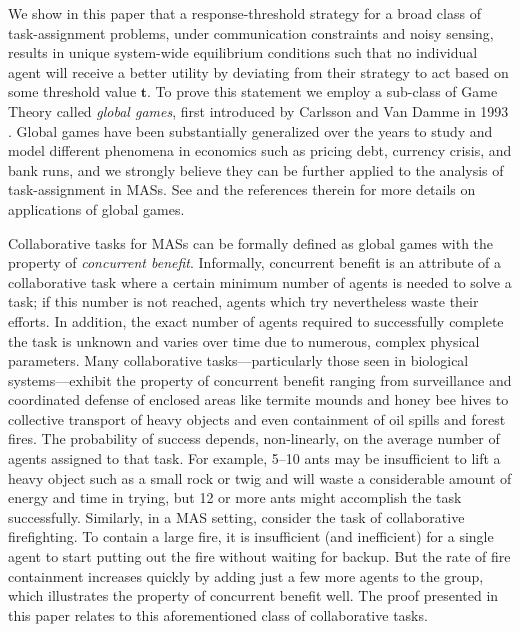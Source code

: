 \documentclass[conference]{ieeeconf}
\newcommand{\td}{\mathbf{t}}
\begin{document}
We show in this paper that a response-threshold strategy for a broad class of task-assignment problems, under communication constraints  and noisy sensing, results in unique system-wide equilibrium conditions such that no individual agent will receive a better utility by deviating from their strategy to act based on some threshold value $\td$. To prove this statement we employ a sub-class of Game Theory called \emph{global games}, first introduced by Carlsson and Van Damme in 1993 \cite{Carlsson1993}. Global games have been substantially generalized over the years to study and model different phenomena in economics such as pricing debt, currency crisis, and bank runs, and we strongly believe they can be further applied to the analysis of task-assignment in MASs. See \cite{Morris2000} and the references therein for more details on applications of global games.

Collaborative tasks for MASs can be formally defined as global games with the property of \emph{concurrent benefit}. Informally, concurrent benefit is an attribute of a collaborative task where a certain minimum number of agents is needed to solve a task; if this number is not reached, agents which try nevertheless waste their efforts. In addition, the exact number of agents required to successfully complete the task is unknown and varies over time due to numerous, complex physical parameters. Many collaborative tasks---particularly those seen in biological systems---exhibit the property of concurrent benefit ranging from surveillance and coordinated defense of enclosed areas like termite mounds and honey bee hives \cite{Breed1990} to collective transport of heavy objects and even containment of oil spills and forest fires. The probability of success depends, non-linearly, on the average number of agents assigned to that task. For example, 5--10 ants may be insufficient to lift a heavy object such as a small rock or twig and will waste a considerable amount of energy and time in trying, but 12 or more ants might accomplish the task successfully. Similarly, in a MAS setting, consider the task of collaborative firefighting. To contain a large fire, it is insufficient (and inefficient) for a single agent to start putting out the fire without waiting for backup. But the rate of fire containment increases quickly by adding just a few more agents to the group, which illustrates the property of concurrent benefit well. The proof presented in this paper relates to this aforementioned class of collaborative tasks.
\end{document}
